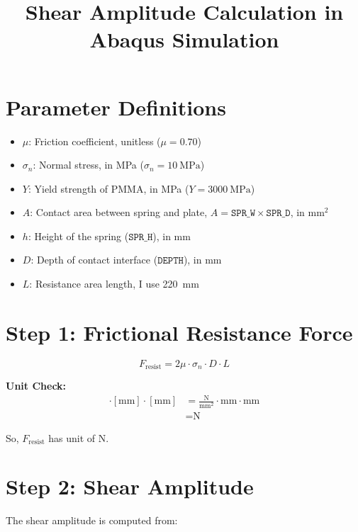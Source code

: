 \documentclass{article}
\title{Shear Amplitude Calculation in Abaqus Simulation}
\author{}
\date{}
\begin{document}
\maketitle

\section*{Parameter Definitions}

\begin{itemize}
    \item $\mu$: Friction coefficient, unitless ($\mu = 0.70$)
    \item $\sigma_n$: Normal stress, in MPa ($\sigma_n = \SI{10}{\mega\pascal}$)
    \item $Y$: Yield strength of PMMA, in MPa ($Y = \SI{3000}{\mega\pascal}$)
    \item $A$: Contact area between spring and plate, $A = \texttt{SPR\_W} \times \texttt{SPR\_D}$, in mm$^2$
    \item $h$: Height of the spring ($\texttt{SPR\_H}$), in mm
    \item $D$: Depth of contact interface ($\texttt{DEPTH}$), in mm
    \item $L$: Resistance area length, I use \SI{220}{\milli\meter}
\end{itemize}

\section*{Step 1: Frictional Resistance Force}

\begin{equation}
F_{\text{resist}} = 2 \mu \cdot \sigma_n \cdot D \cdot L
\end{equation}

\textbf{Unit Check:}
\begin{align*}
[\text{MPa}] \cdot [\text{mm}] \cdot [\text{mm}] &= \frac{\si{\newton}}{\si{\milli\meter\squared}} \cdot \si{\milli\meter} \cdot \si{\milli\meter} \\
&= \si{\newton}
\end{align*}

So, $F_{\text{resist}}$ has unit of \si{\newton}.

\section*{Step 2: Shear Amplitude}

The shear amplitude is computed from:
\end{document}
